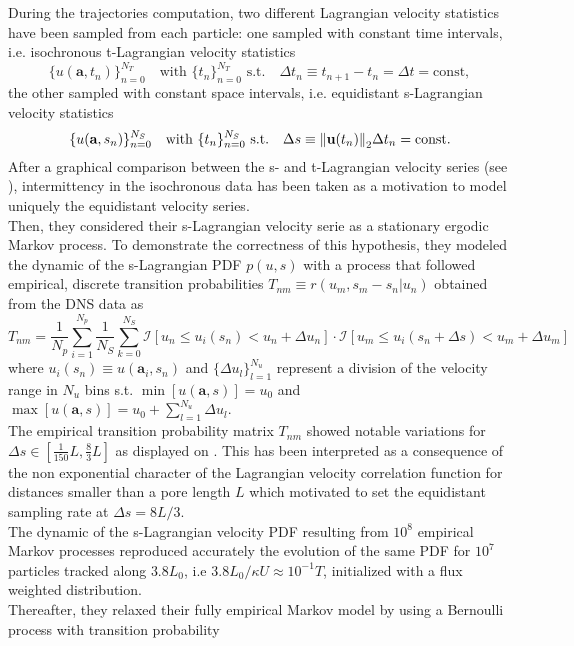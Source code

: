 During the trajectories computation, two different Lagrangian velocity statistics have been sampled from each particle: one sampled with constant time intervals, i.e. isochronous t-Lagrangian velocity statistics
\[
\{u(\textbf{a},t_{n})\}_{n=0}^{N_T}\quad\textrm{with $\{t_n\}_{n=0}^{N_T}$ s.t.}\quad \Delta t_n\equiv t_{n+1}-t_n = \Delta t=\mathrm{const},
\] 
the other sampled with constant space intervals, i.e. equidistant s-Lagrangian velocity statistics
\[\{u(\textbf{a},s_{n})\}_{n=0}^{N_S}\quad\textrm{with $\{t_n\}_{n=0}^{N_S}$ s.t.}\quad \Delta s \equiv\norm{\textbf{u}(t_n)}_2\Delta t_n = \mathrm{const}.
\]
After a graphical comparison between the s- and t-Lagrangian velocity series (see \citet[Fig. 2]{Puyguiraud2019}), intermittency in the isochronous data has been taken as a motivation to model uniquely the equidistant velocity series.\\
Then, they considered their s-Lagrangian velocity serie as a stationary ergodic Markov process. 
To demonstrate the correctness of this hypothesis, they modeled the dynamic of the s-Lagrangian PDF $p(u,s)$ with a process that followed empirical, discrete transition probabilities $T_{nm}\equiv r(u_m,s_m-s_n|u_n)$ obtained from the DNS data as
\[
T_{nm}=\frac{1}{N_p}\sum_{i=1}^{N_p}\frac{1}{N_S}\sum_{k=0}^{N_S}\mathcal{I}[u_n \leq u_i(s_n) < u_n + \Delta u_n]\cdot\mathcal{I}[u_m \leq u_i(s_n+\Delta s) < u_m + \Delta u_m]
\]
where $u_i(s_n)\equiv u(\textbf{a}_i,s_n)$ and $\{\Delta u_l\}_{l=1}^{N_u}$ represent a division of the velocity range in $N_u$ bins s.t. $\min[u(\textbf{a},s)]=u_0$ and $\max[u(\textbf{a},s)]=u_{0}+\sum_{l=1}^{N_u}\Delta u_l$.\\
The empirical transition probability matrix $T_{nm}$ showed notable variations for $\Delta s\in[\frac{1}{150}L,\frac{8}{3}L]$ as displayed on \citet[Fig. 7]{Puyguiraud2019}. 
This has been interpreted as a consequence of the non exponential character of the Lagrangian velocity correlation function for distances smaller than a pore length $L$ which motivated \citeauthor{Puyguiraud2019} to set the equidistant sampling rate at $\Delta s = 8L/3$.\\
The dynamic of the s-Lagrangian velocity PDF resulting from $10^8$ empirical Markov processes reproduced accurately the evolution of the same PDF for $10^7$ particles tracked along $3.8L_0$, i.e $3.8L_0/\kappa U\approx 10^{-1}T$, initialized with a flux weighted distribution.\\
Thereafter, they relaxed their fully empirical Markov model by using a Bernoulli process with transition probability
